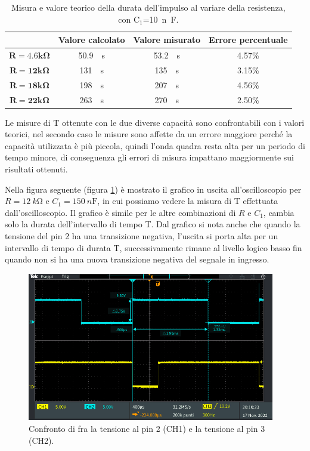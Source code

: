\documentclass{report}
\begin{document}
\begin{table}[h!]
	\centering
	\begin{tabular}{|c|c|c|c|}
		\cline{2-4} 
		\multicolumn{1}{c|}{} & \textbf{Valore calcolato} & \textbf{Valore misurato}& \textbf{Errore percentuale}\\ 
		\hline
		$\mathbf{{R = 4.6k}\Omega}$ & \SI{50.9}{\mu\second} & \SI{53.2}{\mu\second} & 4.57\% \\ 
		\hline
		$\mathbf{{R = 12k}\Omega}$ & \SI{131}{\mu\second} & \SI{135}{\mu\second} & 3.15\% \\ 
		\hline
		$\mathbf{{R = 18k}\Omega}$ & \SI{198}{\mu\second} & \SI{207}{\mu\second} & 4.56\% \\ 
		\hline
		$\mathbf{{R = 22k}\Omega}$ & \SI{263}{\mu\second} & \SI{270}{\mu\second} & 2.50\% \\ 
		\hline
	\end{tabular}
	\caption{Misura e valore teorico della durata dell'impulso al variare della resistenza, con $\mathrm{C_1}$=\SI{10}{n\farad}.}
	\label{table:impulsoCvar}
\end{table}
\newpage
\noindent Le misure di T ottenute con le due diverse capacità sono confrontabili con i valori teorici, nel secondo caso le misure sono affette da un errore maggiore perché la capacità utilizzata è più piccola, quindi l'onda quadra resta alta per un periodo di tempo minore, di  conseguenza gli errori di misura impattano maggiormente sui risultati ottenuti. \par
Nella figura seguente (figura \ref{figura:TEK00014}) è mostrato il grafico in uscita all'oscilloscopio per $R = \SI{12}{k\ohm}$ e $C_1 = \SI{150}{n\farad}$, in cui possiamo vedere la misura di T effettuata dall'oscilloscopio. Il grafico è simile per le altre combinazioni di $R$ e $C_1$, cambia solo la durata dell'intervallo di tempo T. Dal grafico si nota anche che quando la tensione del pin 2 ha una transizione negativa, l'uscita si porta alta per un intervallo di tempo di durata T, successivamente rimane al livello logico basso fin quando non si ha una nuova transizione negativa del segnale in ingresso.
\begin{figure}[h!]
	\centering
	\includegraphics[height=6.5cm]{immagini/TEK00014}
	\caption{Confronto di fra la tensione al pin 2 (CH1) e la tensione al pin 3 (CH2).}
	\label{figura:TEK00014}
\end{figure}
\end{document}
